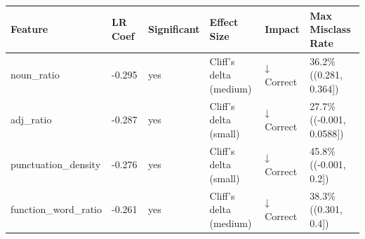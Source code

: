 \begin{tabular}{llllll}
\toprule
Feature & LR Coef & Significant & Effect Size & Impact & Max Misclass Rate \\
\midrule
noun\_ratio & -0.295 & yes & Cliff's delta (medium) & ↓ Correct & 36.2\% ((0.281, 0.364]) \\
adj\_ratio & -0.287 & yes & Cliff's delta (small) & ↓ Correct & 27.7\% ((-0.001, 0.0588]) \\
punctuation\_density & -0.276 & yes & Cliff's delta (small) & ↓ Correct & 45.8\% ((-0.001, 0.2]) \\
function\_word\_ratio & -0.261 & yes & Cliff's delta (medium) & ↓ Correct & 38.3\% ((0.301, 0.4]) \\
\bottomrule
\end{tabular}
